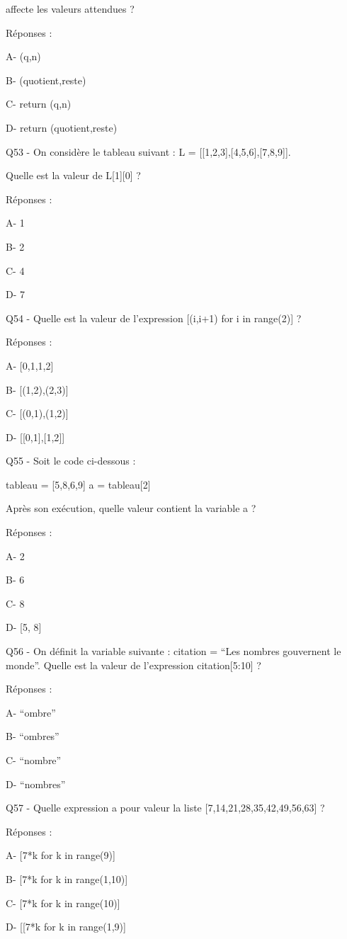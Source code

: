 \documentclass[
]{book}
\begin{document}
affecte les valeurs attendues ?

Réponses :

A- (q,n)

B- (quotient,reste)

C- return (q,n)

D- return (quotient,reste)

Q53 - On considère le tableau suivant : L = {[}{[}1,2,3{]},{[}4,5,6{]},{[}7,8,9{]}{]}.

Quelle est la valeur de L{[}1{]}{[}0{]} ?

Réponses :

A- 1

B- 2

C- 4

D- 7

Q54 - Quelle est la valeur de l'expression {[}(i,i+1) for i in range(2){]} ?

Réponses :

A- {[}0,1,1,2{]}

B- {[}(1,2),(2,3){]}

C- {[}(0,1),(1,2){]}

D- {[}{[}0,1{]},{[}1,2{]}{]}

Q55 - Soit le code ci-dessous :

tableau = {[}5,8,6,9{]}
a = tableau{[}2{]}

Après son exécution, quelle valeur contient la variable a ?

Réponses :

A- 2

B- 6

C- 8

D- {[}5, 8{]}

Q56 - On définit la variable suivante : citation = ``Les nombres gouvernent le monde''. Quelle est la valeur de l'expression citation{[}5:10{]} ?

Réponses :

A- ``ombre''

B- ``ombres''

C- ``nombre''

D- ``nombres''

Q57 - Quelle expression a pour valeur la liste {[}7,14,21,28,35,42,49,56,63{]} ?

Réponses :

A- {[}7*k for k in range(9){]}

B- {[}7*k for k in range(1,10){]}

C- {[}7*k for k in range(10){]}

D- {[}{[}7*k for k in range(1,9){]}
\end{document}
